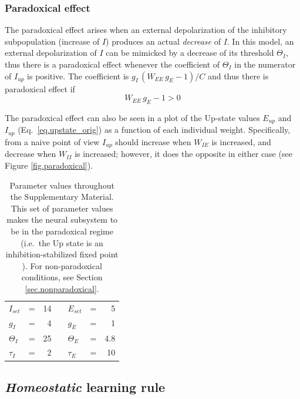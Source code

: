 \documentclass[
twocolumn,
]{article}
\newcommand{\EE}{\mathit{EE}}
\newcommand{\IE}{\mathit{IE}}
\newcommand{\II}{\mathit{II}}
\newcommand{\set}{\mathit{set}}
\newcommand{\up}{\mathit{up}}
\begin{document}
\subsubsection{Paradoxical effect}

The paradoxical effect arises when an external depolarization of the inhibitory subpopulation (increase of $I$) produces an actual {\em decrease} of $I$. In this model, an external depolarization of $I$ can be mimicked by a decrease of its threshold $\Theta_I$, thus there is a paradoxical effect whenever the coefficient of $\Theta_I$ in the numerator of $I_{up}$ is positive. The coefficient is $g_I \, (W_{\EE} \, g_E - 1)/C$ and thus there is paradoxical effect if
\begin{equation}
W_{\EE} \, g_E - 1 >0
\label{eq.paradoxical}
\end{equation}

The paradoxical effect can also be seen in a plot of the Up-state values $E_{\up}$ and $I_{\up}$ (Eq.\ \ref{eq.upstate_orig}) as a function of each individual weight. Specifically, from a naive point of view $I_{\up}$ should increase when $W_{\IE}$ is increased, and decrease when $W_{\II}$ is increased; however, it does the opposite in either case (see Figure \ref{fig.paradoxical}).


\begin{table}[ht]
\centering
\begin{tabular}{lcrclcr}
$I_{\set}$ & = & 14 & \hspace{1cm} & $E_{\set}$ & = & 5 \\
$g_I$ & = & 4 & & $g_E$ & = & 1 \\
$\Theta_I$ & = & 25 & & $\Theta_E$ & = & 4.8 \\
$\tau_I$ & = & 2 & & $\tau_E$ & = & 10
\end{tabular}
\caption{Parameter values throughout the Supplementary Material. This set of parameter values makes the neural subsystem to be in the paradoxical regime (i.e.\ the Up state is an inhibition-stabilized fixed point \cite{Sadeh2021}). For non-paradoxical conditions, see Section \ref{sec.nonparadoxical}.}
\label{tab.params}
\end{table}






\subsection{{\em Homeostatic} learning rule}
\label{sec.SH_details}
\end{document}
